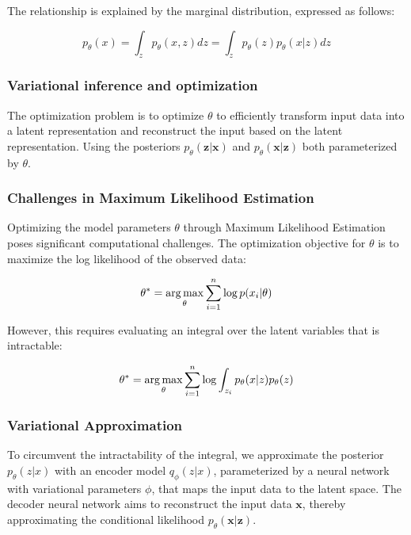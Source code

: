 The relationship is explained by the marginal distribution, expressed as follows:

\begin{equation}
    p_\theta(x) = \int_zp_\theta(x, z) dz= \int_z p_\theta(z)p_\theta(x|z)dz    
\end{equation}

\subsubsection{Variational inference and optimization}
The optimization problem is to optimize $\theta$ to efficiently transform input data into a latent representation and reconstruct the input based on the latent representation.
Using the posteriors $p_\theta(\mathbf{z}|\mathbf{x})$ and $p_\theta(\mathbf{x}|\mathbf{z})$ both parameterized by $\theta$.
\subsubsection{Challenges in Maximum Likelihood Estimation}
Optimizing the model parameters \( \theta \) through Maximum Likelihood Estimation poses significant computational challenges. The optimization objective for \( \theta \) is to maximize the log likelihood of the observed data:

\begin{equation}
    \theta^* = \operatorname*{arg\,max}_\theta \sum_{i=1}^n \log p(x_i | \theta)
\end{equation}

However, this requires evaluating an integral over the latent variables that is intractable:

\begin{equation}
    \theta^* = \operatorname*{arg\,max}_\theta \sum_{i=1}^n \log\int_{z_i}p_\theta(x|z)p_\theta(z)
\end{equation}

\subsubsection{Variational Approximation}
To circumvent the intractability of the integral, we approximate the posterior \( p_\theta(z|x) \) with an encoder model \( q_\phi(z|x) \), parameterized by a neural network with variational parameters $\phi$, that maps the input data to the latent space.
The decoder neural network aims to reconstruct the input data $\mathbf{x}$, thereby approximating the conditional likelihood $p_\theta(\mathbf{x}|\mathbf{z})$.

